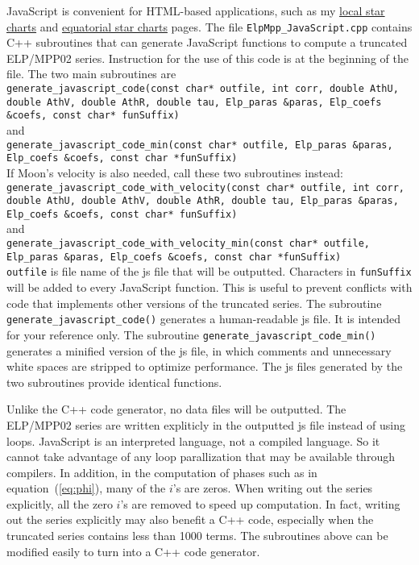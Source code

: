 \documentclass[12pt]{article}
\begin{document}
JavaScript is convenient for HTML-based applications, such as my
\href{https://ytliu0.github.io/starCharts/}{local star charts} and 
\href{https://ytliu0.github.io/starCharts/chartGCRS_min.html}{equatorial star 
charts} pages. The file 
{\tt ElpMpp\_JavaScript.cpp} contains C++ subroutines that can 
generate JavaScript functions to compute a truncated ELP/MPP02 series. 
Instruction for the use of this code is at the beginning of the file. 
The two main subroutines are \\
{\tt generate\_javascript\_code(const char* outfile, int corr,
                       double AthU, double AthV, double AthR, double tau,
                       Elp\_paras \&paras, Elp\_coefs \&coefs, const char* funSuffix)} \\
and \\
{\tt generate\_javascript\_code\_min(const char* outfile, 
                       Elp\_paras \&paras, Elp\_coefs \&coefs, const char *funSuffix)}\\
If Moon's velocity is also needed, call these two subroutines instead:\\
{\tt generate\_javascript\_code\_with\_velocity(const char* outfile, int corr,
                       double AthU, double AthV, double AthR, double tau,
                       Elp\_paras \&paras, Elp\_coefs \&coefs, const char* funSuffix)} \\
and \\
{\tt generate\_javascript\_code\_with\_velocity\_min(const char* outfile, 
                       Elp\_paras \&paras, Elp\_coefs \&coefs, const char *funSuffix)}\\
{\tt outfile} is file name of the js file that will be outputted. 
Characters in {\tt funSuffix} will be added to every JavaScript function. 
This is useful to prevent conflicts with code that implements other versions 
of the truncated series. The subroutine {\tt generate\_javascript\_code()} 
generates a human-readable js file. It is intended for your reference only. The 
subroutine {\tt generate\_javascript\_code\_min()} generates a minified 
version of the js file, in which comments and unnecessary white spaces are 
stripped to optimize performance. The js files generated by the two subroutines 
provide identical functions. 

Unlike the C++ code generator, no data files will be outputted. The ELP/MPP02 
series are written expliticly in the outputted js file instead of using loops. 
JavaScript is an interpreted language, not a compiled language. So it cannot 
take advantage of any loop parallization that may be available through compilers.
In addition, in the computation of phases such as 
in equation~(\ref{eq:phi}), many of the $i$'s are zeros. When writing out the series 
explicitly, all the zero $i$'s are removed to speed up computation. In fact, 
writing out the series explicitly may also benefit a C++ code, especially when the 
truncated series contains less than 1000 terms. The subroutines above can be 
modified easily to turn into a C++ code generator.
\end{document}
